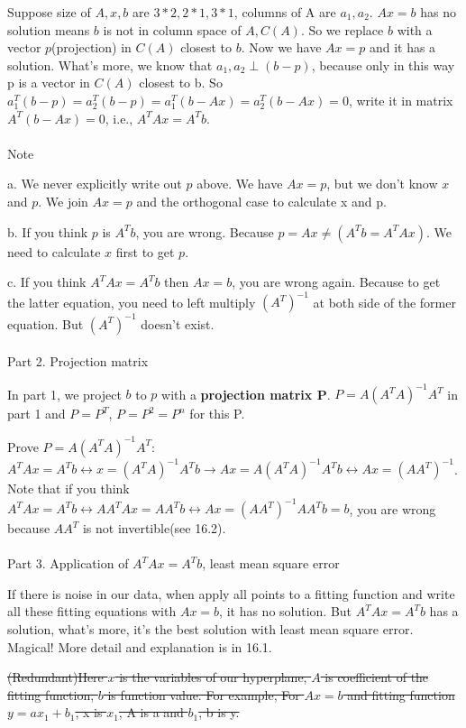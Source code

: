 \documentclass{article}
\begin{document}
\begin{spacing}{1.5}
Suppose size of $A, x, b$ are $3*2, 2*1, 3*1$, columns of A are $a_1, a_2$. $Ax=b$ has no solution means $b$ is not in column space of $A, C(A)$. So we replace $b$ with a vector $p$(projection) in $C(A)$ closest to $b$. Now we have $Ax=p$ and it has a solution. What's more, we know that $a_1, a_2 \perp (b-p)$, because only in this way p is a vector in $C(A)$ closest to b. So $a_1^T(b-p) = a_2^T(b-p) = a_1^T(b-Ax) = a_2^T(b-Ax) = 0$, write it in matrix $A^T(b-Ax)=0$, i.e., $A^TAx = A^Tb$. 
\\\\Note

a. We never explicitly write out $p$ above. We have $Ax=p$, but we don't know $x$ and $p$. We join $Ax=p$ and the orthogonal case to calculate x and p.

b. If you think $p$ is $A^Tb$, you are wrong. Because $p=Ax \neq (A^Tb=A^TAx)$. We need to calculate $x$ first to get $p$.

c. If you think $A^TAx = A^Tb$ then $Ax = b$, you are wrong again. Because to get the latter equation, you need to left multiply $(A^T)^{-1}$ at both side of the former equation. But $(A^T)^{-1}$ doesn't exist. 
\\\\Part 2. Projection matrix

In part 1, we project $b$ to $p$ with a {\bfseries projection matrix P}. $P=A(A^TA)^{-1}A^T$ in part 1 and $P=P^T$, $P=P^2=P^n$ for this P.

Prove $P=A(A^TA)^{-1}A^T$: $A^TAx=A^Tb \leftrightarrow x=(A^TA)^{-1}A^Tb \rightarrow Ax=A(A^TA)^{-1}A^Tb \leftrightarrow Ax=(AA^T)^{-1}$. Note that if you think $A^TAx=A^Tb \leftrightarrow AA^TAx=AA^Tb \leftrightarrow Ax = (AA^T)^{-1}AA^Tb= b$, you are wrong because $AA^T$ is not invertible(see 16.2).
\\\\Part 3. Application of $A^TAx=A^Tb$, least mean square error

If there is noise in our data, when apply all points to a fitting function and write all these fitting equations with $Ax=b$, it has no solution. But $A^TAx=A^Tb$ has a solution, what's more, it's the best solution with least mean square error. Magical! More detail and explanation is in 16.1.

\sout{(Redundant)Here $x$ is the variables of our hyperplane, $A$ is coefficient of the fitting function, $b$ is function value. For example, For $Ax=b$ and fitting function $y=ax_1+b_1$, x is $x_1$, A is a and $b_1$, b is y. }\par



\end{spacing}
\end{document}
